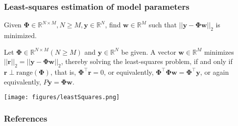 \begin{frame}
    \frametitle{Least-squares estimation of model parameters
    \citep{trefethenAndBau97}}

    \scriptsize
    \begin{probDef}
        Given $\boldsymbol{\Phi}\in\mathbb{R}^{N\times M},N\ge
        M,\mathbf{y}\in\mathbb{R}^N$, find $\mathbf{w}\in\mathbb{R}^M$ such that $||\mathbf{y}-\boldsymbol{\Phi}\boldsymbol{w}||_2$ is minimized.
    \end{probDef}
    \begin{theorem}
        Let $\boldsymbol{\Phi}\in\mathbb{R}^{N\times M} (N\ge M)$ and
        $\mathbf{y}\in\mathbb{R}^N$ be given. A vector
        $\mathbf{w}\in\mathbb{R}^M$ minimizes
        $||\mathbf{r}||_2=||\mathbf{y}-\boldsymbol{\Phi}\mathbf{w}||_2$, thereby solving the
        least-squares problem, if and only if
        $\mathbf{r}\perp\text{range}(\boldsymbol{\Phi})$, that is,
        $\boldsymbol{\Phi}^\intercal\mathbf{r}=0$,
        or equivalently,
        $\boldsymbol{\Phi}^\intercal\boldsymbol{\Phi}\mathbf{w}=\boldsymbol\Phi^\intercal\mathbf{y}$,
        or again equivalently,
        $P\mathbf{y}=\boldsymbol{\Phi}\mathbf{w}$.
    \end{theorem}
	\begin{center}
		\texttt{[image: figures/leastSquares.png]}
	\end{center}

    \normalsize

\end{frame}

\begin{frame}
    \frametitle{References}

    \tiny{
        
        
    }
\end{frame}

\begin{comment}
\end{comment}



